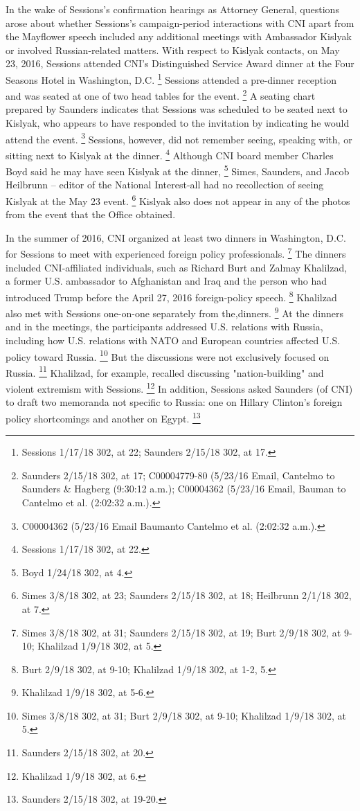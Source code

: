 In the wake of Sessions's confirmation hearings as Attorney General, questions arose about whether Sessions's campaign-period interactions with CNI apart from the Mayflower speech included any additional meetings with Ambassador Kislyak or involved Russian-related matters.
With respect to Kislyak contacts, on May 23, 2016, Sessions attended CNI's Distinguished Service Award dinner at the Four Seasons Hotel in Washington, D.C.%
\footnote{Sessions 1/17/18 302, at 22;
Saunders 2/15/18 302, at 17.}
Sessions attended a pre-dinner reception and was seated at one of two head tables for the event.%
\footnote{Saunders 2/15/18 302, at 17;
C00004779-80 (5/23/16 Email, Cantelmo to Saunders \& Hagberg (9:30:12 a.m.);
C00004362 (5/23/16 Email, Bauman to Cantelmo et al. (2:02:32 a.m.).}
A seating chart prepared by Saunders indicates that Sessions was scheduled to be seated next to Kislyak, who appears to have responded to the invitation by indicating he would attend the event.%
\footnote{C00004362 (5/23/16 Email Baumanto Cantelmo et al. (2:02:32 a.m.).}
Sessions, however, did not remember seeing, speaking with, or sitting next to Kislyak at the dinner.%
\footnote{Sessions 1/17/18 302, at 22.}
Although CNI board member Charles Boyd said he may have seen Kislyak at the dinner,%
\footnote{Boyd 1/24/18 302, at 4.}
Simes, Saunders, and Jacob Heilbrunn -- editor of the National Interest-all had no recollection of seeing Kislyak at the May 23 event.%
\footnote{Simes 3/8/18 302, at 23;
Saunders 2/15/18 302, at 18;
Heilbrunn 2/1/18 302, at 7.}
Kislyak also does not appear in any of the photos from the event that the Office obtained.

In the summer of 2016, CNI organized at least two dinners in Washington, D.C. for Sessions to meet with experienced foreign policy professionals.%
\footnote{Simes 3/8/18 302, at 31;
Saunders 2/15/18 302, at 19;
Burt 2/9/18 302, at 9-10;
Khalilzad 1/9/18 302, at 5.}
The dinners included CNI-affiliated individuals, such as Richard Burt and Zalmay Khalilzad, a former U.S. ambassador to Afghanistan and Iraq and the person who had introduced Trump before the April 27, 2016 foreign-policy speech.%
\footnote{Burt 2/9/18 302, at 9-10;
Khalilzad 1/9/18 302, at 1-2, 5.}
Khalilzad also met with Sessions one-on-one separately from the,dinners.%
\footnote{Khalilzad 1/9/18 302, at 5-6.}
At the dinners and in the meetings, the participants addressed U.S. relations with Russia, including how U.S. relations with NATO and European countries affected U.S. policy toward Russia.%
\footnote{Simes 3/8/18 302, at 31;
Burt 2/9/18 302, at 9-10;
Khalilzad 1/9/18 302, at 5.}
But the discussions were not exclusively focused on Russia.%
\footnote{Saunders 2/15/18 302, at 20.}
Khalilzad, for example, recalled discussing "nation-building" and violent extremism with Sessions.%
\footnote{Khalilzad 1/9/18 302, at 6.}
In addition, Sessions asked Saunders (of CNI) to draft two memoranda not specific to Russia: one on Hillary Clinton's foreign policy shortcomings and another on Egypt.%
\footnote{Saunders 2/15/18 302, at 19-20.}

